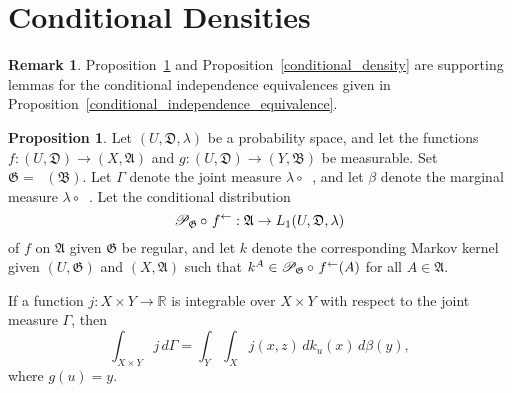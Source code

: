 \documentclass[
twoside=true,
paper=letter,
fontsize=9pt,
pagesize=auto,
leqno,
openany,
headsepline,
overfullrule,
]{scrbook}
\theoremstyle{plain}
\theoremstyle{plain}
\theoremstyle{definition}
\newtheorem{rmk}[thm]{Remark}
\theoremstyle{bfnoteitalic}
\newtheorem{propboldnote}[thm]{Proposition}
\theoremstyle{bfnoteroman}
\newcommand{\sigalg}[1]{\mathfrak{#1}}
\newcommand{\cali}[1]{\mathscr{#1}}
\newcommand{\condprobop}[1]{\mathop{\cali{P}\hspace{-1pt}}\nolimits_{#1}}
\newcommand{\preimage}[1]{\mathop{#1^{\leftarrow}}}
\newcommand{\R}{\mathbb{R}}
\newcommand{\sigmaalgebra}{\sigalg{A}}
\newcommand{\sigmaalgebraii}{\sigalg{B}}
\newcommand{\funcg}{g}
\newcommand{\funcj}{j}
\newcommand{\funck}{k}
\newcommand{\function}{f}
\newcommand{\measurespace}{X}
\newcommand{\measurespaceii}{Y}
\newcommand{\mspaceelt}{x}
\newcommand{\mspaceeltii}{y}
\newcommand{\mspaceeltiii}{z}
\newcommand{\measureiii}{\lambda}
\newcommand{\measlambda}{\lambda}
\newcommand{\seti}{A}
\newcommand{\uspace}{U}%
\newcommand{\uspaceelt}{u}
\newcommand{\uspacesig}{\sigalg{D}}
\newcommand{\measonprod}{\Gamma}%
\newcommand{\marginaltwo}{\beta}%
\begin{document}
\section{Conditional Densities}
\begin{rmk}
Proposition~\ref{joint_decomposition} and Proposition~\ref{conditional_density} are supporting lemmas for the conditional independence equivalences given in Proposition~\ref{conditional_independence_equivalence}.
\end{rmk}

\begin{propboldnote}\label{joint_decomposition}
Let
$(\uspace, \uspacesig, \measureiii)$
be a probability space, and let the functions
$\function:(\uspace,\uspacesig)\to (\measurespace,\sigmaalgebra)$
and
$\funcg:(\uspace,\uspacesig)\to (\measurespaceii,\sigmaalgebraii)$
be measurable. Set
$\sigalg{G} = \preimage{\funcg}(\sigmaalgebraii)$.
Let $\measonprod$ denote the joint measure  $\measureiii\circ\preimage{(\function,\funcg)}$,
and let $\marginaltwo$ denote the marginal measure $\measlambda\circ\preimage{\funcg}$.
Let the conditional distribution
\[
\condprobop{\sigalg{G}}\circ\, \preimage{\function}:
\sigmaalgebra \to L_1(\uspace,\uspacesig,\measureiii)
\]
of $\function$ on $\sigmaalgebra$ given $\sigalg{G}$
be regular, and let
$\funck$
denote the corresponding Markov kernel given
$(\uspace,\sigalg{G})$ and $(\measurespace,\sigmaalgebra)$ such that
$\funck^\seti\in
\condprobop{\sigalg{G}}\circ\, \preimage{\function}(\seti)$
for all $\seti\in\sigmaalgebra$.

If a function
$j:\measurespace\times\measurespaceii \to \R$
is integrable over
$\measurespace\times\measurespaceii$
with respect to the joint measure $\measonprod$,
then
\[
\int_{\measurespace\times\measurespaceii} \funcj \,
d \measonprod
=
\int_\measurespaceii\int_\measurespace
\funcj(\mspaceelt,\mspaceeltiii) \,
d \funck_\uspaceelt(\mspaceelt)\,
d \marginaltwo(\mspaceeltii),
\]
where  $\funcg(\uspaceelt) = \mspaceeltii$.
\end{propboldnote}
\end{document}
